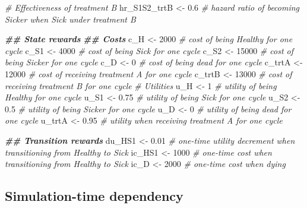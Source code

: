 \documentclass[
]{article}
\newenvironment{Shaded}{\begin{snugshade}}{\end{snugshade}}
\newcommand{\CommentTok}[1]{\textcolor[rgb]{0.56,0.35,0.01}{\textit{#1}}}
\newcommand{\DecValTok}[1]{\textcolor[rgb]{0.00,0.00,0.81}{#1}}
\newcommand{\DocumentationTok}[1]{\textcolor[rgb]{0.56,0.35,0.01}{\textbf{\textit{#1}}}}
\newcommand{\FloatTok}[1]{\textcolor[rgb]{0.00,0.00,0.81}{#1}}
\newcommand{\NormalTok}[1]{#1}
\newcommand{\OtherTok}[1]{\textcolor[rgb]{0.56,0.35,0.01}{#1}}
\begin{document}
\begin{Shaded}
\begin{Highlighting}[]
\CommentTok{\# Effectiveness of treatment B}
\NormalTok{hr\_S1S2\_trtB }\OtherTok{\textless{}{-}} \FloatTok{0.6} \CommentTok{\# hazard ratio of becoming Sicker when Sick under treatment B}

\DocumentationTok{\#\# State rewards}
\DocumentationTok{\#\# Costs}
\NormalTok{c\_H    }\OtherTok{\textless{}{-}} \DecValTok{2000}  \CommentTok{\# cost of being Healthy for one cycle }
\NormalTok{c\_S1   }\OtherTok{\textless{}{-}} \DecValTok{4000}  \CommentTok{\# cost of being Sick for one cycle }
\NormalTok{c\_S2   }\OtherTok{\textless{}{-}} \DecValTok{15000} \CommentTok{\# cost of being Sicker for one cycle}
\NormalTok{c\_D    }\OtherTok{\textless{}{-}} \DecValTok{0}     \CommentTok{\# cost of being dead for one cycle}
\NormalTok{c\_trtA }\OtherTok{\textless{}{-}} \DecValTok{12000} \CommentTok{\# cost of receiving treatment A for one cycle}
\NormalTok{c\_trtB }\OtherTok{\textless{}{-}} \DecValTok{13000} \CommentTok{\# cost of receiving treatment B for one cycle }
\CommentTok{\# Utilities}
\NormalTok{u\_H    }\OtherTok{\textless{}{-}} \DecValTok{1}     \CommentTok{\# utility of being Healthy for one cycle }
\NormalTok{u\_S1   }\OtherTok{\textless{}{-}} \FloatTok{0.75}  \CommentTok{\# utility of being Sick for one cycle }
\NormalTok{u\_S2   }\OtherTok{\textless{}{-}} \FloatTok{0.5}   \CommentTok{\# utility of being Sicker for one cycle}
\NormalTok{u\_D    }\OtherTok{\textless{}{-}} \DecValTok{0}     \CommentTok{\# utility of being dead for one cycle}
\NormalTok{u\_trtA }\OtherTok{\textless{}{-}} \FloatTok{0.95}  \CommentTok{\# utility when receiving treatment A for one cycle}

\DocumentationTok{\#\# Transition rewards}
\NormalTok{du\_HS1 }\OtherTok{\textless{}{-}} \FloatTok{0.01}  \CommentTok{\# one{-}time utility decrement when transitioning from Healthy to Sick}
\NormalTok{ic\_HS1 }\OtherTok{\textless{}{-}} \DecValTok{1000}  \CommentTok{\# one{-}time cost when transitioning from Healthy to Sick}
\NormalTok{ic\_D   }\OtherTok{\textless{}{-}} \DecValTok{2000}  \CommentTok{\# one{-}time cost when dying}
\end{Highlighting}
\end{Shaded}

\hypertarget{simulation-time-dependency-1}{%
\subsection{Simulation-time dependency}\label{simulation-time-dependency-1}}
\end{document}
